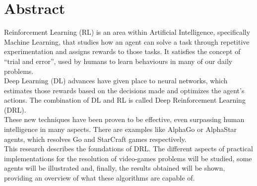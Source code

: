 \documentclass[11pt,fleqn]{book} %
\begin{document}
\newpage

\section*{Abstract}\label{sec:abstract}

Reinforcement Learning (RL) is an area within Artificial Intelligence, specifically Machine Learning, that studies how an agent can solve a task through repetitive experimentation and assigns rewards to those tasks. It satisfies the concept of ``trial and error'', used by humans to learn behaviours in many of our daily problems. \\

Deep Learning (DL) advances have given place to neural networks, which estimates those rewards based on the decisions made and optimizes the agent's actions. The combination of DL and RL is called Deep Reinforcement Learning (DRL). \\

These new techniques have been proven to be effective, even surpassing human intelligence in many aspects. There are examples like AlphaGo or AlphaStar agents, which resolves Go and StarCraft games respectively. \\

This research describes the foundations of DRL. The different aspects of practical implementations for the resolution of video-games problems will be studied, some agents will be illustrated and, finally, the results obtained will be shown, providing an overview of what these algorithms are capable of.

\newpage


\pagestyle{empty} %

\tableofcontents %

\usechapterimagefalse

\listoffigures %

\cleardoublepage %

\pagestyle{fancy} %

\end{document}
